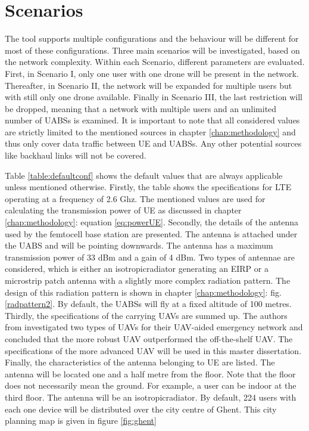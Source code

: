 \chapter{Scenarios}
\label{chap:scenarios} 
The tool supports multiple configurations and the behaviour will be different for most of these configurations. Three main scenarios 
will be investigated, based on the network complexity. Within each Scenario, different parameters are evaluated.
First, in Scenario I, only one user with one drone will be present in the network. 
Thereafter, in Scenario II, the network will  be expanded for multiple users but with still 
only one drone available. 
Finally in Scenario III, the last restriction will be dropped, meaning that a network with 
multiple users and an unlimited number of \gls{UABS}s is examined.
It is important to note that 
all considered values are strictly limited to the mentioned sources in chapter \ref{chap:methodology} and thus only cover data traffic 
between \gls{UE} and \gls{UABS}s. Any other potential sources like backhaul links will not be covered.

Table \ref{table:defaultconf} shows the default values that are always applicable unless mentioned otherwise. 
Firstly, the table shows 
the specifications for LTE operating at a frequency of 2.6 Ghz. The mentioned values are used for calculating 
the transmission power of \gls{UE} as discussed in chapter \ref{chap:methodology}: equation \ref{eq:powerUE}. 
Secondly, the details of the antenna
used by the femtocell base station are presented. The antenna is attached under the \gls{UABS} and will be pointing downwards. 
The antenna has a maximum transmission power of 33 dBm and 
a gain of 4 dBm. Two types of antennae are considered, which is either an \gls{isotropicradiator}  generating an \gls{EIRP} 
or a microstrip patch antenna with a slightly more complex radiation pattern. The design of this radiation pattern is shown 
in chapter \ref{chap:methodology}: fig. \ref{radpattern2}. By default, the \gls{UABS}s will fly at a fixed altitude of 100 metres.
Thirdly, the specifications of the carrying \gls{UAV}s are summed up. 
The authors from \cite{J2} investigated two types of \gls{UAV}s for their \gls{UAV}-aided emergency network 
and concluded that the more robust \gls{UAV} outperformed the off-the-shelf \gls{UAV}.
The specifications of the more advanced \gls{UAV} will be used in this master dissertation.
Finally, the characteristics of the antenna belonging to \gls{UE} are listed. The antenna will be located 
one and a half metre from the floor. Note that the floor does not necessarily mean the ground.
For example, a user can be indoor at the third floor.
The antenna will be an \gls{isotropicradiator}. By default, 224 users with each one device 
will be distributed over the city centre of Ghent. This city planning map is given in figure \ref{fig:ghent}

